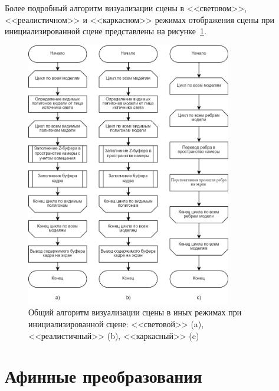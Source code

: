 Более подробный алгоритм визуализации сцены в <<световом>>, <<реалистичном>> и <<каркасном>> режимах отображения сцены при инициализированной сцене представлены на рисунке~\ref{fig:other-mods}.
\begin{figure}[h] 
	\centering
	\includegraphics[width=0.8\textwidth]{images/other-mods.png}
	\caption{Общий алгоритм визуализации сцены в иных режимах при инициализированной сцене: <<световой>> (a), <<реалистичный>> (b), <<каркасный>> (c)} 
	\label{fig:other-mods} 
\end{figure}

\clearpage

\section{Афинные преобразования}

